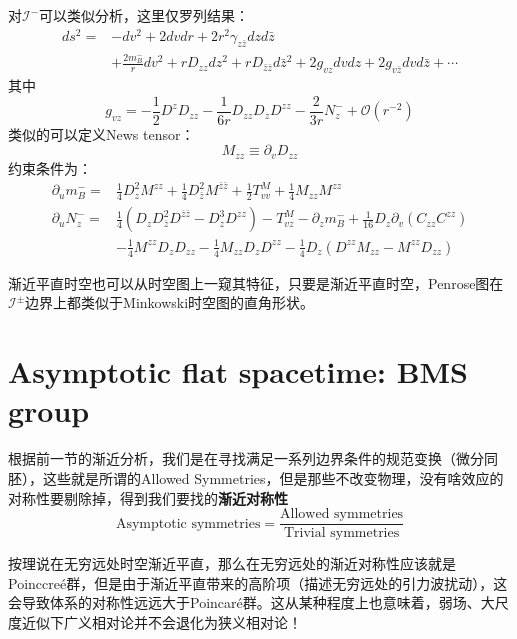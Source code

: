 对$\mathcal{I}^{-}$可以类似分析，这里仅罗列结果：
\begin{equation}
	\begin{aligned}
		ds^2=&-dv^2+2dvdr+2r^2\gamma_{z\bar z}dzd{\bar z}\\
		&+\frac{2m^-_B}{r}dv^2+rD_{zz}dz^2+rD_{\bar z\bar z}d{\bar z}^2+2g_{vz}dvdz+2g_{v\bar z}dvd\bar z+\cdots
	\end{aligned}
\end{equation}
其中
\begin{equation}
	g_{vz}=-\frac{1}{2}D^zD_{zz}-\frac{1}{6r}D_{zz}D_zD^{zz}-\frac{2}{3r}N^-_z+\mathcal{O}(r^{-2})
\end{equation}
类似的可以定义News tensor：
\begin{equation}
	M_{zz}\equiv \partial_v D_{zz}
\end{equation}
约束条件为：
\begin{equation}
	\begin{aligned}
		\partial_u m^-_B=&\frac{1}{4}D_z^2M^{zz}+\frac{1}{4}D_{\bar z}^2M^{\bar z\bar z}+\frac{1}{2}T^M_{vv}+\frac{1}{4}M_{zz}M^{zz}\\
		\partial_u N^-_z=&\frac{1}{4}\left(D_zD_{\bar z}^2D^{\bar z\bar z}-D^3_zD^{zz}\right)-T^{M}_{vz}-\partial_z m^-_B+\frac{1}{16}D_z\partial_v(C_{zz}C^{zz})\\
		&-\frac{1}{4}M^{zz}D_zD_{zz}-\frac{1}{4}M_{zz}D_zD^{zz}-\frac{1}{4}D_z\left(D^{zz}M_{zz}-M^{zz}D_{zz}\right)
	\end{aligned}
\end{equation}

渐近平直时空也可以从时空图上一窥其特征\cite{zhaoliu}，只要是渐近平直时空，Penrose图在$\mathcal{I}^\pm$边界上都类似于Minkowski时空图的直角形状。

\section{Asymptotic flat spacetime: BMS group}
根据前一节的渐近分析，我们是在寻找满足一系列边界条件的规范变换（微分同胚），这些就是所谓的Allowed Symmetries，但是那些不改变物理，没有啥效应的对称性要剔除掉，得到我们要找的\textbf{渐近对称性}
\begin{equation}
	\text{Asymptotic symmetries}=\frac{\text{Allowed symmetries}}{\text{Trivial symmetries}}
\end{equation}

按理说在无穷远处时空渐近平直，那么在无穷远处的渐近对称性应该就是Poinccre\'e群，但是由于渐近平直带来的高阶项（描述无穷远处的引力波扰动），这会导致体系的对称性远远大于Poincar\'e群。这从某种程度上也意味着，弱场、大尺度近似下广义相对论并不会退化为狭义相对论！

